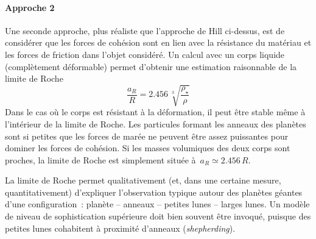 \paragraph{Approche 2} Une seconde approche, plus réaliste que l'approche de Hill ci-dessus, est de considérer que les forces de cohésion sont en lien avec la résistance du matériau et les forces de friction dans l'objet considéré. Un calcul avec un corps liquide (complètement déformable) permet d'obtenir une estimation raisonnable de la limite de Roche
\[ \frac{a_R}{R} = 2.456 \, \sqrt[3]{ \frac{\rho_{\star}}{\rho} } \]
\noindent Dans le cas où le corps est résistant à la déformation, il peut être stable même à l'intérieur de la limite de Roche. Les particules formant les anneaux des planètes sont si petites que les forces de marée ne peuvent être assez puissantes pour dominer les forces de cohésion. Si les masses volumiques des deux corps sont proches, la limite de Roche est simplement située à~$a_R \simeq 2.456 \, R$.

\sk
La limite de Roche permet qualitativement (et, dans une certaine mesure, quantitativement) d'expliquer l'observation typique autour des planètes géantes d'une configuration~: planète -- anneaux -- petites lunes -- larges lunes. Un modèle de niveau de sophistication supérieure doit bien souvent être invoqué, puisque des petites lunes cohabitent à proximité d'anneaux (\emph{shepherding}).

